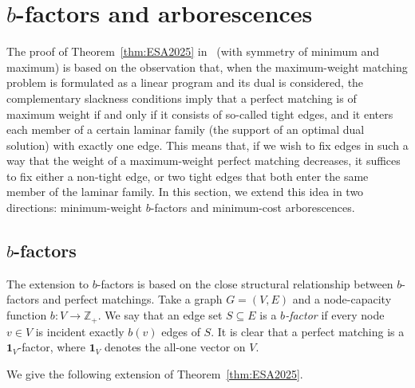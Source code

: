\documentclass{article}
\theoremstyle{plain}
\theoremstyle{definition}
\begin{document}
\section{$b$-factors and arborescences}
\label{sec:bfacandarbs}

The proof of Theorem~\ref{thm:ESA2025} in~\cite{maalouly2025finding} (with symmetry of minimum and maximum) is based on the observation that, when the maximum-weight matching problem is formulated as a linear program and its dual is considered, the complementary slackness conditions imply that a perfect matching is of maximum weight if and only if it consists of so-called tight edges, and it enters each member of a certain laminar family (the support of an optimal dual solution) with exactly one edge. This means that, if we wish to fix edges in such a way that the weight of a maximum-weight perfect matching decreases, it suffices to fix either a non-tight edge, or two tight edges that both enter the same member of the laminar family. In this section, we extend this idea in two directions: minimum-weight $b$-factors and minimum-cost arborescences.

\subsection{$b$-factors}
\label{sec:bfac}

The extension to $b$-factors is based on the close structural relationship between $b$-factors and perfect matchings. Take a graph $G=(V,E)$ and a node-capacity function $b \colon V \to \mathbb{Z}_+$. We say that an edge set $S \subseteq E$ is a \textit{$b$-factor} if every node $v \in V$ is incident exactly $b(v)$ edges of $S$. It is clear that a perfect matching is a $\mathbf{1}_V$-factor, where $\mathbf{1}_V$ denotes the all-one vector on $V$.

We give the following extension of Theorem~\ref{thm:ESA2025}.

\thmbfacs*
\end{document}
